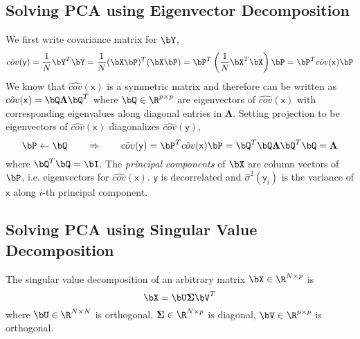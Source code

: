 \documentclass[11pt]{article}
\newcommand\ry{\ensuremath{\mathsf{y}}}
\newcommand\rx{\ensuremath{\mathsf{x}}}
\begin{document}
\subsection{Solving PCA using Eigenvector Decomposition}

We first write covariance matrix for $\bY$,
\[
    \hat{cov}(\ry)
    = \frac{1}{N} \bY^T \bY
    = \frac{1}{N} (\bX\bP)^T (\bX\bP)
    = \bP^T \left( \frac{1}{N} \bX^T\bX \right) \bP
    = \bP^T \hat{cov}(\rx) \bP
\]
We know that $\hat{cov}(\rx)$ is a symmetric matrix and therefore can be written as $\hat{cov}(\rx) = \bQ \boldsymbol{\Lambda} \bQ^T$ where $\bQ \in \R^{p\times p}$ are eigenvectors of $\hat{cov}(\rx)$ with corresponding eigenvalues along diagonal entries in $\boldsymbol{\Lambda}$. Setting projection to be eigenvectors of $\hat{cov}(\rx)$ diagonalizes $\hat{cov}(\ry)$,
\[
    \bP \leftarrow \bQ
    \quad\quad \Rightarrow \quad\quad
    \hat{cov}(\ry)
    = \bP^T \hat{cov}(\rx) \bP
    = \bQ^T \bQ \boldsymbol{\Lambda} \bQ^T \bQ
    = \boldsymbol{\Lambda} 
\]
where $\bQ^T\bQ = \bI$. The \textit{principal components} of $\bX$ are column vectors of $\bP$, i.e. eigenvectors for $\hat{cov}(\rx)$. $\ry$ is decorrelated and $\hat{\sigma}^2(\ry_i)$ is the variance of $\rx$ along $i$-th principal component.

\subsection{Solving PCA using Singular Value Decomposition}


The singular value decomposition of an arbitrary matrix $\bX \in \R^{N\times p}$ is
\[
    \bX = \bU \boldsymbol{\Sigma} \bV^T
\]
where $\bU \in \R^{N\times N}$ is orthogonal, $\boldsymbol{\Sigma} \in \R^{N\times p}$ is diagonal, $\bV \in \R^{p\times p}$ is orthogonal.
\end{document}
